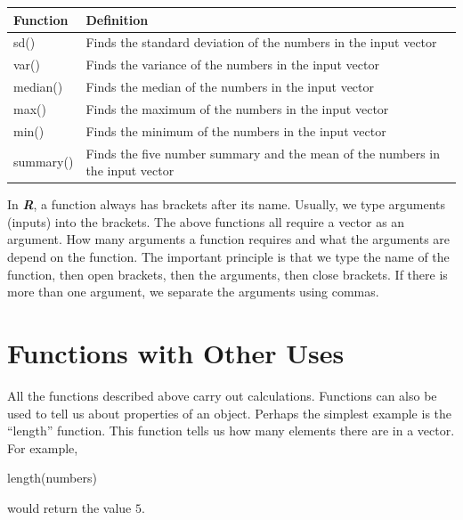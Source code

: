 \documentclass[
]{book}
\begin{document}
\begin{longtable}[]{@{}
  >{\centering\arraybackslash}p{}
  >{\centering\arraybackslash}p{}@{}}
\toprule\noalign{}
\begin{minipage}[b]{\linewidth}\centering
Function
\end{minipage} & \begin{minipage}[b]{\linewidth}\centering
Definition
\end{minipage} \\
\midrule\noalign{}
\endhead
\bottomrule\noalign{}
\endlastfoot
sd() & Finds the standard deviation of the numbers in the input vector \\
var() & Finds the variance of the numbers in the input vector \\
median() & Finds the median of the numbers in the input vector \\
max() & Finds the maximum of the numbers in the input vector \\
min() & Finds the minimum of the numbers in the input vector \\
summary() & Finds the five number summary and the mean of the numbers in the input vector \\
\end{longtable}

In \textbf{\emph{R}}, a function always has brackets after its name. Usually, we type arguments (inputs) into the brackets. The above functions all require a vector as an argument. How many arguments a function requires and what the arguments are depend on the function. The important principle is that we type the name of the function, then open brackets, then the arguments, then close brackets. If there is more than one argument, we separate the arguments using commas.

\section{Functions with Other Uses}\label{functions-with-other-uses}

All the functions described above carry out calculations. Functions can also be used to tell us about properties of an object. Perhaps the simplest example is the ``length'' function. This function tells us how many elements there are in a vector. For example,

length(numbers)

would return the value \(5\).
\end{document}
